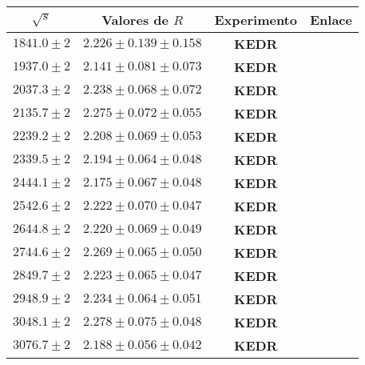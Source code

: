 \begin{table}[!h]
\centering
\footnotesize
\begin{tabular}{|cccc|}
\toprule
$\sqrt{s}$ & Valores de $R$ & Experimento & Enlace\\ \midrule
$1841.0\pm 2$ 	& $2.226 \pm 0.139\pm 0.158$ &  \textbf{KEDR} & \cite{RRKerd}\\%
$1937.0\pm 2$ 	& $2.141 \pm 0.081\pm 0.073$ &  \textbf{KEDR} & \cite{RRKerd}\\%
$2037.3\pm 2$ 	& $2.238 \pm 0.068\pm 0.072$ &  \textbf{KEDR} & \cite{RRKerd}\\%
$2135.7\pm 2$ 	& $2.275 \pm 0.072\pm 0.055$ &  \textbf{KEDR} & \cite{RRKerd}\\%
$2239.2\pm 2$ 	& $2.208 \pm 0.069\pm 0.053$ &  \textbf{KEDR} & \cite{RRKerd}\\%
$2339.5\pm 2$ 	& $2.194 \pm 0.064\pm 0.048$ &  \textbf{KEDR} & \cite{RRKerd}\\%
$2444.1\pm 2$ 	& $2.175 \pm 0.067\pm 0.048$ &  \textbf{KEDR} & \cite{RRKerd}\\%
$2542.6\pm 2$ 	& $2.222 \pm 0.070\pm 0.047$ &  \textbf{KEDR} & \cite{RRKerd}\\%
$2644.8\pm 2$ 	& $2.220 \pm 0.069\pm 0.049$ &  \textbf{KEDR} & \cite{RRKerd}\\%
$2744.6\pm 2$ 	& $2.269 \pm 0.065\pm 0.050$ &  \textbf{KEDR} & \cite{RRKerd}\\%
$2849.7\pm 2$ 	& $2.223 \pm 0.065\pm 0.047$ &  \textbf{KEDR} & \cite{RRKerd}\\%
$2948.9\pm 2$ 	& $2.234 \pm 0.064\pm 0.051$ &  \textbf{KEDR} & \cite{RRKerd}\\%
$3048.1\pm 2$ 	& $2.278 \pm 0.075\pm 0.048$ &  \textbf{KEDR} & \cite{RRKerd}\\%
$3076.7\pm 2$ 	& $2.188 \pm 0.056\pm 0.042$ &  \textbf{KEDR} & \cite{RRKerd}\\%


\end{tabular}
\end{table}
